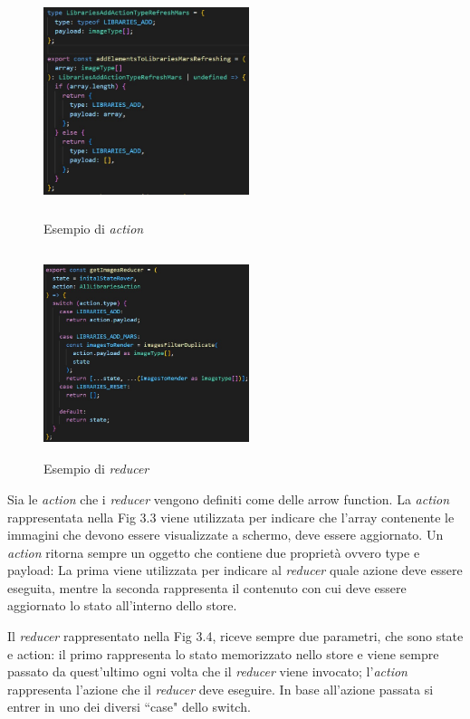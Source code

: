 \begin{figure}[h]
    \begin{minipage}[b]{0.47\textwidth}
        \centering
        \includegraphics[width=6cm, height=6cm]{images/ActionRedux.jpg}
        \caption{\label{f_etichetta1} Esempio di \textit{action}}
    \end{minipage}
    \hfill
    \begin{minipage}[b]{0.47\textwidth}
        \centering
        \includegraphics[width=6cm, height=6cm]{images/ReduxReducersFunction.jpg}
        \caption{\label{f_etichetta2}Esempio di \textit{reducer}}
    \end{minipage}
\end{figure}

Sia le \textit{action} che i \textit{reducer} vengono definiti come delle arrow function. La \textit{action} rappresentata nella Fig 3.3 viene utilizzata per indicare che l'array contenente le immagini che devono essere visualizzate a schermo, deve essere aggiornato.
Un \textit{action} ritorna sempre un oggetto che contiene due propriet\`a ovvero type e payload: La prima viene utilizzata per indicare al \textit{reducer} quale azione deve essere eseguita, mentre la seconda rappresenta il contenuto con cui deve essere aggiornato lo stato all'interno dello store.

Il \textit{reducer} rappresentato nella Fig 3.4, riceve sempre due parametri, che sono state e action: il primo rappresenta lo stato memorizzato nello store e viene sempre passato da quest'ultimo ogni volta che il \textit{reducer} viene invocato; l'\textit{action} rappresenta l'azione che il \textit{reducer} deve eseguire.
In base all'azione passata si entrer in uno dei diversi ``case" dello switch.

